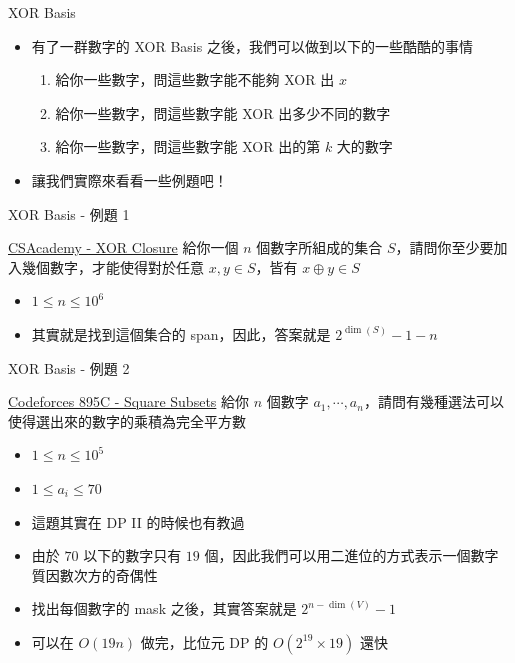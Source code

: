 \documentclass[aspectratio=169]{beamer}
\begin{document}
    \begin{frame}{XOR Basis}
        \begin{itemize}
            \item 有了一群數字的 XOR Basis 之後，我們可以做到以下的一些酷酷的事情
            \begin{enumerate}
                \item 給你一些數字，問這些數字能不能夠 XOR 出 $x$
                \item 給你一些數字，問這些數字能 XOR 出多少不同的數字
                \item 給你一些數字，問這些數字能 XOR 出的第 $k$ 大的數字
            \end{enumerate}
            \item 讓我們實際來看看一些例題吧！
        \end{itemize}
    \end{frame}
    
    \begin{frame}{XOR Basis - 例題 1}
        \begin{block}{\href{https://csacademy.com/contest/archive/task/xor-closure/}{CSAcademy - XOR Closure}}
            給你一個 $n$ 個數字所組成的集合 $S$，請問你至少要加入幾個數字，才能使得對於任意 $x,y \in S$，皆有 $x \oplus y \in S$
            \begin{itemize}
                \item $1 \le n \le 10^6$
            \end{itemize}
        \end{block}
        \begin{itemize}
            \item<2-> 其實就是找到這個集合的 span，因此，答案就是 $2^{\dim(S)}-1-n$
        \end{itemize}
    \end{frame}
    
    \begin{frame}{XOR Basis - 例題 2}
        \begin{block}{\href{https://codeforces.com/contest/895/problem/C}{Codeforces 895C - Square Subsets}}
            給你 $n$ 個數字 $a_1, \cdots,a_n$，請問有幾種選法可以使得選出來的數字的乘積為完全平方數
            \begin{itemize}
                \item $1 \leq n \leq 10^5$
                \item $1 \le a_i \le 70$
            \end{itemize}
        \end{block}
        \begin{itemize}
            \item<2-> 這題其實在 DP II 的時候也有教過
            \item<3-> 由於 $70$ 以下的數字只有 $19$ 個，因此我們可以用二進位的方式表示一個數字質因數次方的奇偶性
            \item<4-> 找出每個數字的 mask 之後，其實答案就是 $2^{n-\dim(V)} - 1$
            \item<4-> 可以在 $O(19n)$ 做完，比位元 DP 的 $O(2^{19} \times 19)$ 還快
        \end{itemize}
    \end{frame}
    
\end{document}
